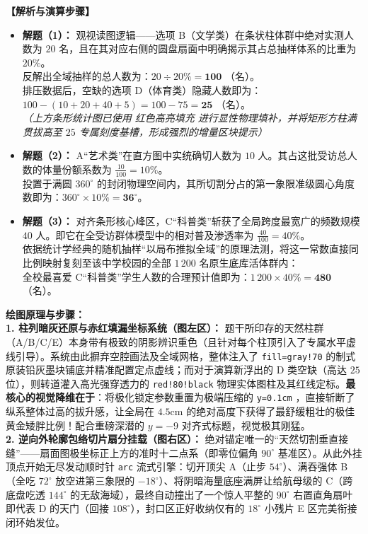 \vspace{0.4cm}
\textbf{【解析与演算步骤】}
\begin{itemize}
    \item \textbf{解题（1）：} 观视读图逻辑——选项 B（文学类）在条状柱体群中绝对实测人数为 $20$ 名，且在其对应右侧的圆盘扇面中明确揭示其占总抽样体系的比重为 $20\%$。\\
    反解出全域抽样的总人数为：$20 \div 20\% = \mathbf{100}$ （名）。\\
    排压数据后，空缺的选项 D（体育类）隐藏人数即为：$100 - (10 + 20 + 40 + 5) = 100 - 75 = \mathbf{25}$ （名）。\\
    \textit{（上方条形统计图已使用 \textcolor{red!80!black}{红色高亮填充} 进行显性物理填补，并将矩形方柱满贯拔高至 $25$ 专属刻度基槽，形成强烈的增量区块提示）}
    \item \textbf{解题（2）：} A“艺术类”在直方图中实统确切人数为 $10$ 人。其占这批受访总人数的体量份额系数为 $\frac{10}{100} = 10\%$。\\
    投置于满圆 $360^\circ$ 的封闭物理空间内，其所切割分占的第一象限准级圆心角度数即为：$360^\circ \times 10\% = \mathbf{36^\circ}$。
    \item \textbf{解题（3）：} 对齐条形核心峰区，C“科普类”斩获了全局跨度最宽广的频数规模 $40$ 人。即它在全受访群体模型中的相对普及渗透率为 $\frac{40}{100} = 40\%$。\\
    依据统计学经典的随机抽样“以局布推拟全域”的原理法测，将这一常数直接同比例映射复刻至该中学校园的全部 $1\,200$ 名原生底库活体群内：\\
    全校最喜爱 C“科普类”学生人数的合理预计值即为：$1\,200 \times 40\% = \mathbf{480}$ （名）。
\end{itemize}

\vspace{0.4cm}
{\small\color{blue!70!black}
\textbf{绘图原理与步骤：}\\
\textbf{1. 柱列暗灰还原与赤红填漏坐标系统（图左区）：} 题干所印存的天然柱群（A/B/C/E）本身带有极致的阴影辨识重色（且针对每个柱顶引入了专属水平虚线引导）。系统由此摒弃空腔画法及全域网格，整体注入了 \texttt{fill=gray!70} 的制式原装铅灰墨块铺底并精准配置定点虚线；而对于演算新浮出的 D 类空缺（高达 $25$ 位），则转道灌入高光强穿透力的 \texttt{red!80!black} 物理实体图柱及其红线定标。\textbf{最核心的视觉降维在于}：将极化锁定参数重置为极端压缩的 \texttt{y=0.1cm} ，直接斩断了纵系整体过高的拔升感，让全局在 $4.5\mathrm{cm}$ 的绝对高度下获得了最舒缓粗壮的极佳黄金矮胖比例！配合重磅深潜的 $y=-9$ 对齐式标题，视觉极其刚猛。\\
\textbf{2. 逆向外轮廓包络切片扇分挂载（图右区）：} 绝对锚定唯一的“天然切割垂直接缝”——扇面图极坐标正上方的准时十二点系（即零位偏角 $90^\circ$ 基准区）。从此外挂顶点开始无尽发动顺时针 \texttt{arc} 流式引擎：切开顶尖 A（止步 $54^\circ$）、满吞强体 B（全吃 $72^\circ$ 放空进第三象限的 $-18^\circ$）、将阴暗海量底座满屏让给航母级的 C（跨底盘吃透 $144^\circ$ 的无敌海域），最终自动撞出了一个惊人平整的 $90^\circ$ 右置直角扇叶即代表 D 的天门（回接 $108^\circ$），封口区正好收纳仅有的 $18^\circ$ 小残片 E 区完美衔接闭环始发位。
}

